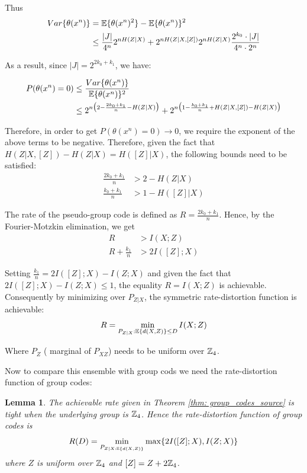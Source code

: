 \documentclass[conference]{IEEEtran}
\theoremstyle{plain}
\newtheorem{lem}{Lemma}
\theoremstyle{definition}
\theoremstyle{remark}
\begin{document}
Thus 
\begin{align*}
Var\{\theta(x^n)\}&=\mathbb{E}\{\theta(x^n)^2\}-\mathbb{E}\{\theta(x^n)\}^2\\
&\leq \frac{|J|}{4^n}2^{nH(Z|X)}+2^{nH(Z|X,[Z])}2^{nH(Z|X)} \frac{2^{k_0} \cdot |J|}{4^n \cdot 2^n}
\end{align*}


As a result, since $|J|=2^{2k_0+k_1}$, we have:

\begin{align*}
P(\theta(x^n)=0)&\leq \frac{Var\{\theta(x^n)\}}{\mathbb{E}\{\theta(x^n)\}^2}\\
&\leq  2^{n\big(2-\frac{2k_0+k_1}{n} -H(Z|X)\big)} +   2^{n\big(1-\frac{k_0+k_1}{n}+H(Z|X,[Z])-H(Z|X)\big)}
\end{align*}

Therefore, in order to get $P(\theta(x^n)=0)\rightarrow 0$, we require the exponent of the above terms to be negative. Therefore, given the fact that $H(Z|X,[Z])-H(Z|X)=H([Z]|X)$, the following bounds need to be satisfied:
\begin{align*}
\frac{2k_0+k_1}{n} &> 2-H(Z|X)\\
\frac{k_0+k_1}{n} &> 1-H([Z]|X)
\end{align*}

The rate of the pseudo-group code is defined as $R=\frac{2k_0+k_1}{n}$. Hence, by the Fourier-Motzkin elimination, we get
\begin{align*}
R &> I(X;Z)\\
R+\frac{k_1}{n} &> 2I([Z];X)
\end{align*}

Setting $\frac{k_1}{n}=2I([Z];X)-I(Z;X)$ and given the fact that $2I([Z];X)-I(Z;X)\leq 1$, the equality $ R=I(X;Z) $ is achievable. Consequently by minimizing over $P_{Z|X}$, the symmetric rate-distortion function is achievable:
\begin{equation*}
R=\min_{P_{Z|X}: \mathbb{E}\{d(X,Z)\}\leq D} I(X;Z)
\end{equation*}

Where $P_Z$ ( marginal of $P_{XZ}$) needs to be uniform over $\mathbb{Z}_4$.

Now to compare this ensemble with group cods we need the rate-distortion function of group codes:

\begin{lem}\label{lem: source coding_ groups_Z_4}
The achievable rate given in Theorem \ref{thm: group_codes_source} is tight when the underlying group is $\mathbb{Z}_4$. Hence the rate-distortion function of group codes is
\begin{equation}
R(D)=\min_{P_{Z|X: \mathbb{E}\{d(X,Z)\}}}\max \{2I([Z];X), I(Z;X)\}
\end{equation} 
where $Z$ is uniform over $\mathbb{Z}_4$ and $[Z]=Z+2\mathbb{Z}_4$.
\end{lem}
\end{document}
